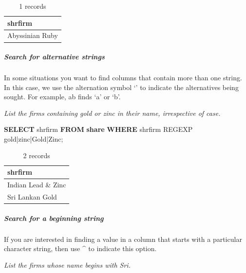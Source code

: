 \documentclass[
]{article}
\newenvironment{Shaded}{\begin{snugshade}}{\end{snugshade}}
\newcommand{\KeywordTok}[1]{\textcolor[rgb]{0.13,0.29,0.53}{\textbf{#1}}}
\newcommand{\NormalTok}[1]{#1}
\newcommand{\StringTok}[1]{\textcolor[rgb]{0.31,0.60,0.02}{#1}}
\begin{document}
\begin{table}

\caption{\label{tab:unnamed-chunk-28}1 records}
\centering
\begin{tabular}[t]{l}
\hline
shrfirm\\
\hline
Abyssinian Ruby\\
\hline
\end{tabular}
\end{table}

\hypertarget{search-for-alternative-strings}{%
\subparagraph*{Search for alternative strings}\label{search-for-alternative-strings}}

In some situations you want to find columns that contain more than one string. In this case, we use the alternation symbol `\textbar{}' to indicate the alternatives being sought. For example, a\textbar b finds `a' or `b'.

\emph{List the firms containing gold or zinc in their name, irrespective of case.}

\begin{Shaded}
\begin{Highlighting}[]
\KeywordTok{SELECT}\NormalTok{ shrfirm }\KeywordTok{FROM} \KeywordTok{share} \KeywordTok{WHERE}\NormalTok{ shrfirm REGEXP }\StringTok{\textquotesingle{}gold|zinc|Gold|Zinc\textquotesingle{}}\NormalTok{;}
\end{Highlighting}
\end{Shaded}

\begin{table}

\caption{\label{tab:unnamed-chunk-29}2 records}
\centering
\begin{tabular}[t]{l}
\hline
shrfirm\\
\hline
Indian Lead \& Zinc\\
\hline
Sri Lankan Gold\\
\hline
\end{tabular}
\end{table}

\hypertarget{search-for-a-beginning-string}{%
\subparagraph*{Search for a beginning string}\label{search-for-a-beginning-string}}

If you are interested in finding a value in a column that starts with a particular character string, then use \^{} to indicate this option.

\emph{List the firms whose name begins with Sri.}
\end{document}

